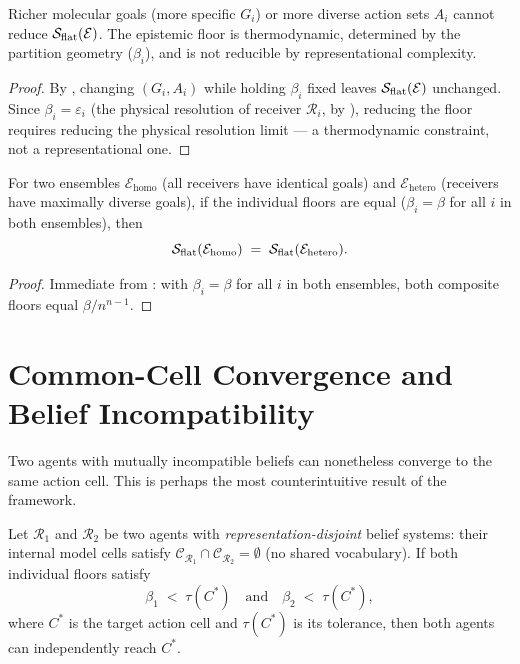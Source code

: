 \begin{corollary}
\label{cor:no-molecular-specificity}
Richer molecular goals (more specific $G_i$) or more diverse action sets
$A_i$ cannot reduce $\mathcal{S}_{\mathrm{flat}}(\mathcal{E})$.  The epistemic floor is
thermodynamic, determined by the partition geometry ($\beta_i$), and is not
reducible by representational complexity.
\end{corollary}

\begin{proof}
By , changing $(G_i, A_i)$ while holding
$\beta_i$ fixed leaves $\mathcal{S}_{\mathrm{flat}}(\mathcal{E})$ unchanged.  Since
$\beta_i = \varepsilon_i$ (the physical resolution of receiver $\mathcal{R}_i$,
by ), reducing the floor requires reducing the
physical resolution limit — a thermodynamic constraint, not a representational one.
\end{proof}

\begin{proposition}
\label{prop:goal-diversity}
For two ensembles $\mathcal{E}_{\mathrm{homo}}$ (all receivers have identical
goals) and $\mathcal{E}_{\mathrm{hetero}}$ (receivers have maximally diverse
goals), if the individual floors are equal ($\beta_i = \beta$ for all $i$
in both ensembles), then
\[
  \mathcal{S}_{\mathrm{flat}}(\mathcal{E}_{\mathrm{homo}})
  \;=\; \mathcal{S}_{\mathrm{flat}}(\mathcal{E}_{\mathrm{hetero}}) .
\]
\end{proposition}

\begin{proof}
Immediate from : with $\beta_i = \beta$
for all $i$ in both ensembles, both composite floors equal $\beta/n^{n-1}$.
\end{proof}

\section{Common-Cell Convergence and Belief Incompatibility}
\label{sec:common-cell}

Two agents with mutually incompatible beliefs can nonetheless converge to the
same action cell.  This is perhaps the most counterintuitive result of the
framework.

\begin{theorem}
\label{thm:common-cell}
Let $\mathcal{R}_1$ and $\mathcal{R}_2$ be two agents with
\emph{representation-disjoint} belief systems: their internal model cells
satisfy $\mathcal{C}_{\mathcal{R}_1} \cap \mathcal{C}_{\mathcal{R}_2} = \emptyset$
(no shared vocabulary).  If both individual floors satisfy
\[
  \beta_1 \;<\; \tau(C^*) \quad \text{and} \quad \beta_2 \;<\; \tau(C^*) ,
\]
where $C^*$ is the target action cell and $\tau(C^*)$ is its tolerance, then
both agents can independently reach $C^*$.
\end{theorem}

